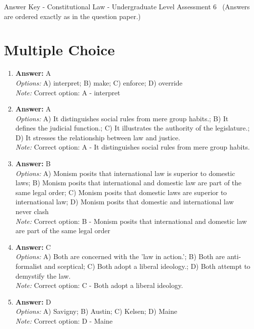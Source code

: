 \documentclass[12pt]{article}
\begin{document}
\begin{center}
Answer Key - Constitutional Law - Undergraduate Level Assessment 6 \
\small (Answers are ordered exactly as in the question paper.)
\end{center}

\section*{Multiple Choice}
\begin{enumerate}[label=\arabic*.]
\item \textbf{Answer:} A
\\ \textit{Options:} A) interpret; B) make; C) enforce; D) override
\\ \textit{Note:} Correct option: A - interpret
\item \textbf{Answer:} A
\\ \textit{Options:} A) It distinguishes social rules from mere group habits.; B) It defines the judicial function.; C) It illustrates the authority of the legislature.; D) It stresses the relationship between law and justice.
\\ \textit{Note:} Correct option: A - It distinguishes social rules from mere group habits.
\item \textbf{Answer:} B
\\ \textit{Options:} A) Monism posits that international law is superior to domestic laws; B) Monism posits that international and domestic law are part of the same legal order; C) Monism posits that domestic laws are superior to international law; D) Monism posits that domestic and international law never clash
\\ \textit{Note:} Correct option: B - Monism posits that international and domestic law are part of the same legal order
\item \textbf{Answer:} C
\\ \textit{Options:} A) Both are concerned with the 'law in action.'; B) Both are anti-formalist and sceptical; C) Both adopt a liberal ideology.; D) Both attempt to demystify the law.
\\ \textit{Note:} Correct option: C - Both adopt a liberal ideology.
\item \textbf{Answer:} D
\\ \textit{Options:} A) Savigny; B) Austin; C) Kelsen; D) Maine
\\ \textit{Note:} Correct option: D - Maine
\end{enumerate}
\end{document}
